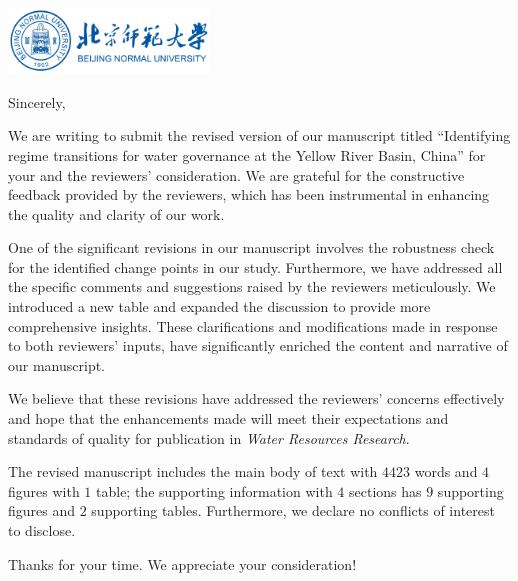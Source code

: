 \documentclass[11pt,a4paper,roman]{moderncv}
\begin{document}
\begin{minipage}[t]{\textwidth}
\includegraphics[width=0.40\textwidth]{bnu}
\end{minipage}


\opening{\vspace*{-2em}}
\closing{Sincerely,}{\vspace*{-2em}}
\makelettertitle
\justify

We are writing to submit the revised version of our manuscript titled ``Identifying regime transitions for water governance at the Yellow River Basin, China'' for your and the reviewers’ consideration. We are grateful for the constructive feedback provided by the reviewers, which has been instrumental in enhancing the quality and clarity of our work.

One of the significant revisions in our manuscript involves the robustness check for the identified change points in our study. Furthermore, we have addressed all the specific comments and suggestions raised by the reviewers meticulously. We introduced a new table and expanded the discussion to provide more comprehensive insights. These clarifications and modifications made in response to both reviewers’ inputs, have significantly enriched the content and narrative of our manuscript.

We believe that these revisions have addressed the reviewers’ concerns effectively and hope that the enhancements made will meet their expectations and standards of quality for publication in \textit{Water Resources Research}.

The revised manuscript includes the main body of text with $4423$ words and $4$ figures with $1$ table; the supporting information with $4$ sections has $9$ supporting figures and $2$ supporting tables. Furthermore, we declare no conflicts of interest to disclose.

\vspace{0.3cm}

Thanks for your time. We appreciate your consideration!
\end{document}
